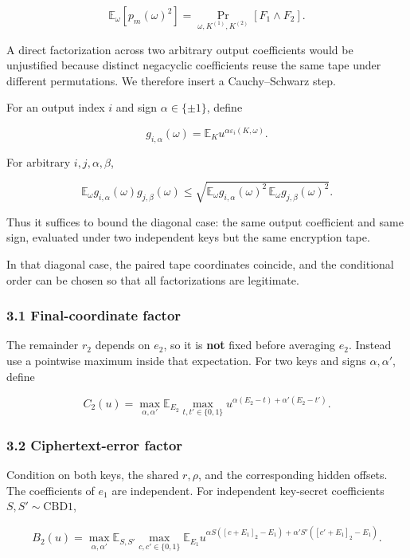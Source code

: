 \documentclass[11pt,a4paper]{article}
\begin{document}
\[
\mathbb E_\omega[p_m(\omega)^2]
=
\Pr_{\omega,K^{(1)},K^{(2)}}[F_1\wedge F_2].
\]

A direct factorization across two arbitrary output coefficients would be unjustified because distinct negacyclic coefficients reuse the same tape under different permutations. We therefore insert a Cauchy--Schwarz step.

For an output index \(i\) and sign \(\alpha\in\{\pm1\}\), define

\[
g_{i,\alpha}(\omega)
=
\mathbb E_K
u^{\alpha\varepsilon_i(K,\omega)}.
\]

For arbitrary \(i,j,\alpha,\beta\),

\[
\mathbb E_\omega
g_{i,\alpha}(\omega)g_{j,\beta}(\omega)
\le
\sqrt{
\mathbb E_\omega g_{i,\alpha}(\omega)^2\,
\mathbb E_\omega g_{j,\beta}(\omega)^2
}.
\]

Thus it suffices to bound the diagonal case: the same output coefficient and same sign, evaluated under two independent keys but the same encryption tape.

In that diagonal case, the paired tape coordinates coincide, and the conditional order can be chosen so that all factorizations are legitimate.

\subsubsection{3.1 Final-coordinate factor}\label{final-coordinate-factor}

The remainder \(r_2\) depends on \(e_2\), so it is \textbf{not} fixed before averaging \(e_2\). Instead use a pointwise maximum inside that expectation. For two keys and signs \(\alpha,\alpha'\), define

\[
C_2(u)
=
\max_{\alpha,\alpha'}
\mathbb E_{E_2}
\max_{t,t'\in\{0,1\}}
u^{\alpha(E_2-t)+\alpha'(E_2-t')}.
\]

\subsubsection{3.2 Ciphertext-error factor}\label{ciphertext-error-factor}

Condition on both keys, the shared \(r,\rho\), and the corresponding hidden offsets. The coefficients of \(e_1\) are independent. For independent key-secret coefficients \(S,S'\sim\mathrm{CBD1}\),

\[
B_2(u)
=
\max_{\alpha,\alpha'}
\mathbb E_{S,S'}
\max_{c,c'\in\{0,1\}}
\mathbb E_{E_1}
u^{
\alpha S([c+E_1]_2-E_1)
+
\alpha'S'([c'+E_1]_2-E_1)
}.
\]
\end{document}
